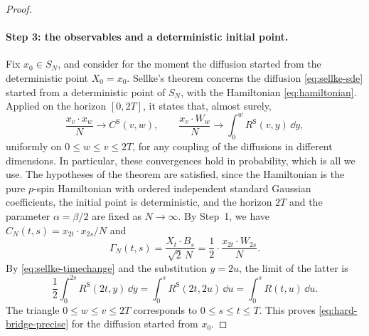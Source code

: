\begin{proof}
\paragraph{Step 3: the observables and a deterministic initial point.}
Fix $x_0\in S_N$, and consider for the moment the diffusion started from the deterministic point $X_0=x_0$. Sellke's theorem \cite[arXiv version~5, Theorem~4.3, p.~23]{sellke2024} concerns the diffusion \eqref{eq:sellke-sde} started from a deterministic point of $S_N$, with the Hamiltonian \eqref{eq:hamiltonian}. Applied on the horizon $[0,2T]$, it states that, almost surely,
\[
 \frac{x_v\cdot x_w}N\longrightarrow C^{\mathrm S}(v,w),\qquad
 \frac{x_v\cdot W_w}N\longrightarrow\int_0^wR^{\mathrm S}(v,y)\,\dd y,
\]
uniformly on $0\le w\le v\le2T$, for any coupling of the diffusions in different dimensions. In particular, these convergences hold in probability, which is all we use. The hypotheses of the theorem are satisfied, since the Hamiltonian is the pure $p$-spin Hamiltonian with ordered independent standard Gaussian coefficients, the initial point is deterministic, and the horizon $2T$ and the parameter $\alpha=\beta/2$ are fixed as $N\to\infty$. By Step~1, we have $C_N(t,s)=x_{2t}\cdot x_{2s}/N$ and
\[
 \Gamma_N(t,s)=\frac{X_t\cdot B_s}{\sqrt2\,N}=\frac12\cdot\frac{x_{2t}\cdot W_{2s}}N.
\]
By \eqref{eq:sellke-timechange} and the substitution $y=2u$, the limit of the latter is
\[
 \frac12\int_0^{2s}R^{\mathrm S}(2t,y)\,\dd y=\int_0^sR^{\mathrm S}(2t,2u)\,\dd u=\int_0^sR(t,u)\,\dd u.
\]
The triangle $0\le w\le v\le2T$ corresponds to $0\le s\le t\le T$. This proves \eqref{eq:hard-bridge-precise} for the diffusion started from $x_0$.


\end{proof}
